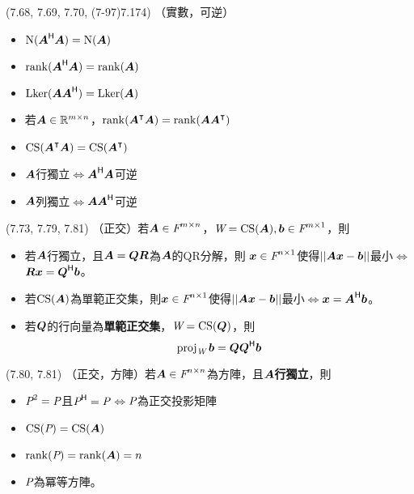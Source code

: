 \item \begin{theorem}{(7.68, 7.69, 7.70, (7-97)7.174)} （實數，可逆）
	\begin{itemize}
		\item $\Ker(\mat{A}\herm \mat{A}) = \Ker(\mat{A})$
		\item $\rnk(\mat{A}\herm \mat{A}) = \rnk(\mat{A})$
		\item $\lker(\mat{A} \mat{A}\herm) = \lker(\mat{A})$
		\item 若$\mat{A} \in \R^{m \times n}$，$\rnk(\mat{A}^\intercal \mat{A}) = \rnk(\mat{A}\mat{A}^\intercal)$
		\item $\cs(\mat{A}^\intercal\mat{A}) = \cs(\mat{A}^\intercal)$
		\item $\mat{A}$行獨立$\iff$$\mat{A}\herm\mat{A}$可逆
		\item $\mat{A}$列獨立$\iff$$\mat{A}\mat{A}\herm$可逆
	\end{itemize}
\end{theorem}

\item \begin{theorem}{(7.73, 7.79, 7.81)} （正交）若$\mat{A} \in \F^{m \times n}$，$\spc{W} = \cs(\mat{A}), \vec{b} \in \F^{m \times 1}$，則
	\begin{itemize}
		\item 若$\mat{A}$行獨立，且$\mat{A} = \mat{QR}$為$\mat{A}$的QR分解，則
		$\vec{x} \in \F^{n \times 1}$使得$||\mat{A}\vec{x} - \vec{b}||$最小$\iff$$\mat{R}\vec{x} = \mat{Q}\herm \vec{b}$。
		\item 若$\cs(\mat{A})$為單範正交集，則$\vec{x} \in \F^{n \times 1}$使得$||\mat{A}\vec{x} - \vec{b}||$最小$\iff$$\vec{x} = \mat{A}\herm\vec{b}$。
		\item 若$\mat{Q}$的行向量為\textbf{單範正交集}，$\spc{W} = \cs(\mat{Q})$，則
		\begin{equation}
			\proj{\spc{W}}{b} = \mat{Q}\mat{Q}\herm\vec{b}
		\end{equation}
	\end{itemize}
\end{theorem}

\item \begin{theorem}{(7.80, 7.81)} （正交，方陣）若$\mat{A} \in \F^{n \times n}$為方陣，且$\mat{A}$\textbf{行獨立}，則
	\begin{itemize}
		\item $\P^2 = \P$且$\P\herm = \P$$\iff$$\P$為正交投影矩陣
		\item $\cs(\P) = \cs(\mat{A})$
		\item $\rnk(\P) = \rnk(\mat{A}) = n$
		\item $\P$為冪等方陣。
	\end{itemize}
\end{theorem}

